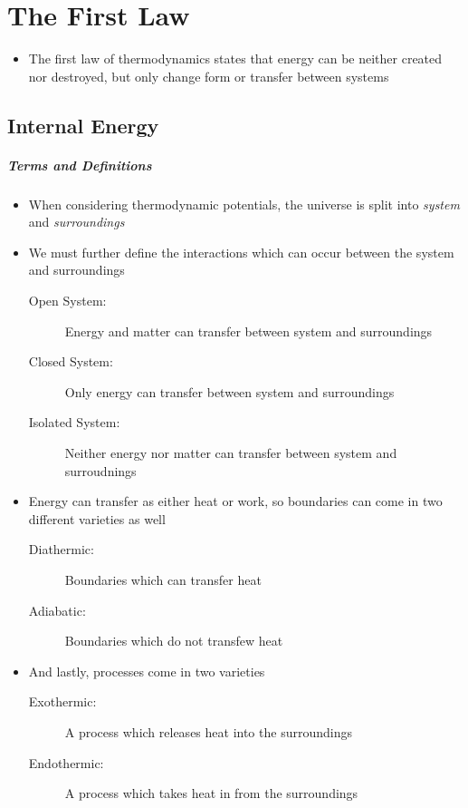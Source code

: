 \documentclass[12pt, openany, letterpaper]{memoir}
\begin{document}
\chapter{The First Law}
\begin{itemize}
	\item The first law of thermodynamics states that energy can be neither created nor destroyed, but only change form or transfer between systems
\end{itemize}
\section{Internal Energy}
\paragraph{Terms and Definitions}
\begin{itemize}
	\item When considering thermodynamic potentials, the universe is split into \emph{system} and \emph{surroundings}
	\item We must further define the interactions which can occur between the system and surroundings
	\begin{description}
		\item [Open System:] Energy and matter can transfer between system and surroundings
		\item [Closed System:] Only energy can transfer between system and surroundings
		\item [Isolated System:] Neither energy nor matter can transfer between system and surroudnings
	\end{description}
	\item Energy can transfer as either heat or work, so boundaries can come in two different varieties as well
	\begin{description}
		\item [Diathermic:] Boundaries which can transfer heat
		\item [Adiabatic:] Boundaries which do not transfew heat
	\end{description}	
	\item And lastly, processes come in two varieties
	\begin{description}
		\item[Exothermic:] A process which releases heat into the surroundings
		\item[Endothermic:] A process which takes heat in from the surroundings
	\end{description}
\end{itemize}
\end{document}
